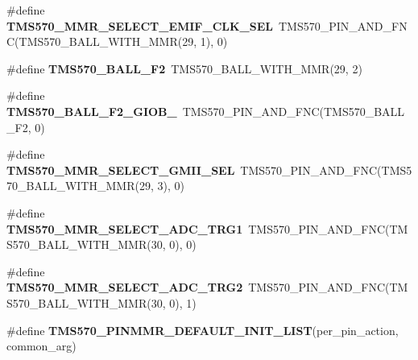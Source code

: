 \begin{DoxyCompactItemize}
\mbox{\label{tms570ls3137zwt-pins_8h_a85578124f836e6ac6c8a641bcaa1db79}} 
\#define {\bfseries T\+M\+S570\+\_\+\+M\+M\+R\+\_\+\+S\+E\+L\+E\+C\+T\+\_\+\+E\+M\+I\+F\+\_\+\+C\+L\+K\+\_\+\+S\+EL}~T\+M\+S570\+\_\+\+P\+I\+N\+\_\+\+A\+N\+D\+\_\+\+F\+NC(T\+M\+S570\+\_\+\+B\+A\+L\+L\+\_\+\+W\+I\+T\+H\+\_\+\+M\+MR(29, 1), 0)
\item 
\mbox{\label{tms570ls3137zwt-pins_8h_adf9d37c2c8fa14695c7645c703bb8697}} 
\#define {\bfseries T\+M\+S570\+\_\+\+B\+A\+L\+L\+\_\+\+F2}~T\+M\+S570\+\_\+\+B\+A\+L\+L\+\_\+\+W\+I\+T\+H\+\_\+\+M\+MR(29, 2)
\item 
\mbox{\label{tms570ls3137zwt-pins_8h_aa61da5414bfaf06f100863f172ac0db2}} 
\#define {\bfseries T\+M\+S570\+\_\+\+B\+A\+L\+L\+\_\+\+F2\+\_\+\+G\+I\+O\+B\+\_}~T\+M\+S570\+\_\+\+P\+I\+N\+\_\+\+A\+N\+D\+\_\+\+F\+NC(T\+M\+S570\+\_\+\+B\+A\+L\+L\+\_\+\+F2, 0)
\item 
\mbox{\label{tms570ls3137zwt-pins_8h_a9a44b6341ddd448636953cdef26886ba}} 
\#define {\bfseries T\+M\+S570\+\_\+\+M\+M\+R\+\_\+\+S\+E\+L\+E\+C\+T\+\_\+\+G\+M\+I\+I\+\_\+\+S\+EL}~T\+M\+S570\+\_\+\+P\+I\+N\+\_\+\+A\+N\+D\+\_\+\+F\+NC(T\+M\+S570\+\_\+\+B\+A\+L\+L\+\_\+\+W\+I\+T\+H\+\_\+\+M\+MR(29, 3), 0)
\item 
\mbox{\label{tms570ls3137zwt-pins_8h_addfa3f7e31047616ddbcbb53b2acfec2}} 
\#define {\bfseries T\+M\+S570\+\_\+\+M\+M\+R\+\_\+\+S\+E\+L\+E\+C\+T\+\_\+\+A\+D\+C\+\_\+\+T\+R\+G1}~T\+M\+S570\+\_\+\+P\+I\+N\+\_\+\+A\+N\+D\+\_\+\+F\+NC(T\+M\+S570\+\_\+\+B\+A\+L\+L\+\_\+\+W\+I\+T\+H\+\_\+\+M\+MR(30, 0), 0)
\item 
\mbox{\label{tms570ls3137zwt-pins_8h_ababc005eb80ee00252cbf2bfd20cb417}} 
\#define {\bfseries T\+M\+S570\+\_\+\+M\+M\+R\+\_\+\+S\+E\+L\+E\+C\+T\+\_\+\+A\+D\+C\+\_\+\+T\+R\+G2}~T\+M\+S570\+\_\+\+P\+I\+N\+\_\+\+A\+N\+D\+\_\+\+F\+NC(T\+M\+S570\+\_\+\+B\+A\+L\+L\+\_\+\+W\+I\+T\+H\+\_\+\+M\+MR(30, 0), 1)
\item 
\mbox{\label{tms570ls3137zwt-pins_8h_a2e08af1e20d43d4f8e3f04b67ea7ba24}} 
\#define {\bfseries T\+M\+S570\+\_\+\+P\+I\+N\+M\+M\+R\+\_\+\+D\+E\+F\+A\+U\+L\+T\+\_\+\+I\+N\+I\+T\+\_\+\+L\+I\+ST}(per\+\_\+pin\+\_\+action,  common\+\_\+arg)
\end{DoxyCompactItemize}


